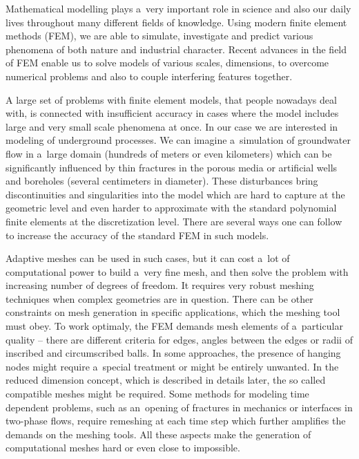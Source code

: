 Mathematical modelling plays a~very important role in science and also our daily lives throughout many different
fields of knowledge. Using modern finite element methods (FEM), we are able to simulate, investigate and predict
various phenomena of both nature and industrial character. Recent advances in the field of FEM
enable us to solve models of various scales, dimensions, to overcome numerical problems and also 
to couple interfering features together.

A large set of problems with finite element models, that people nowadays deal with, is connected with 
insufficient accuracy in cases where the model includes large and very small scale phenomena at once.
In our case we are interested in modeling of underground processes.
We can imagine a~simulation of groundwater flow in a~large domain (hundreds of meters or even kilometers) which can be significantly
influenced by thin fractures in the porous media or artificial wells and boreholes (several centimeters in diameter).
These disturbances bring discontinuities and singularities into the model which are hard to capture at the geometric level
and even harder to approximate with the standard polynomial finite elements at the discretization level.
There are several ways one can follow to increase the accuracy of the standard FEM in such models. 

Adaptive meshes can be used in such cases, but it can cost a~lot of computational power to build a~very fine mesh,
and then solve the problem with increasing number of degrees of freedom.
It requires very robust meshing techniques when complex geometries are in question.
There can be other constraints on mesh generation in specific applications, which the meshing tool must obey.
To work optimaly, the FEM demands mesh elements of a~particular quality -- there are different criteria
for edges, angles between the edges or radii of inscribed and circumscribed balls.
In some approaches, the presence of hanging nodes might require a~special treatment or might be entirely unwanted.
In the reduced dimension concept, which is described in details later, the so called compatible meshes might be required.
Some methods for modeling time dependent problems, such as an~opening of fractures in mechanics or interfaces in two-phase flows,
require remeshing at each time step which further amplifies the demands on the meshing tools.
All these aspects make the generation of computational meshes hard or even close to impossible.

